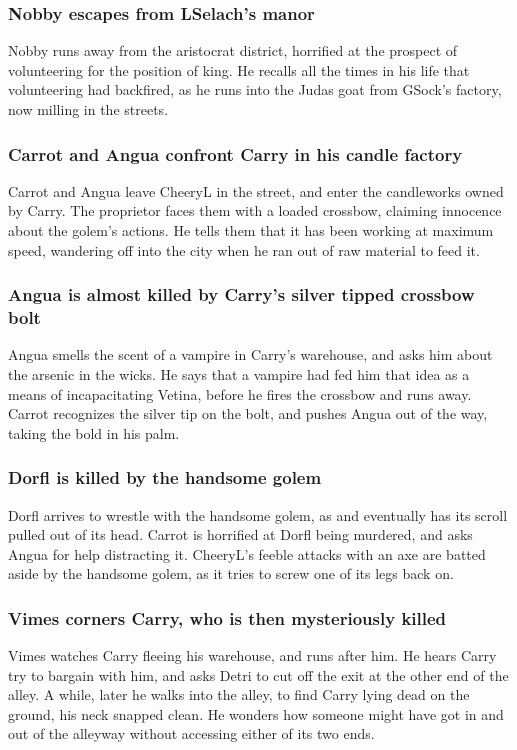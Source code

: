 \subsubsection{\Gls{Nobby} escapes from \Gls{LSelach}'s manor}
\Gls{Nobby} runs away from the aristocrat district, horrified at the prospect of volunteering for
the position of king. He recalls all the times in his life that volunteering had backfired, as he
runs into the Judas goat from \Gls{GSock}'s factory, now milling in the streets.

\subsubsection{\Gls{Carrot} and \Gls{Angua} confront \Gls{Carry} in his candle factory}
\Gls{Carrot} and \Gls{Angua} leave \Gls{CheeryL} in the street, and enter the candleworks owned
by \Gls{Carry}. The proprietor faces them with a loaded crossbow, claiming innocence about the
golem's actions. He tells them that it has been working at maximum speed, wandering off into the
city when he ran out of raw material to feed it.

\subsubsection{\Gls{Angua} is almost killed by \Gls{Carry}'s silver tipped crossbow bolt}
\Gls{Angua} smells the scent of a vampire in \Gls{Carry}'s warehouse, and asks him about the
arsenic in the wicks. He says that a vampire had fed him that idea as a means of incapacitating
\Gls{Vetina}, before he fires the crossbow and runs away. \Gls{Carrot} recognizes the silver tip
on the bolt, and pushes \Gls{Angua} out of the way, taking the bold in his palm.

\subsubsection{\Gls{Dorfl} is killed by the handsome golem}
\Gls{Dorfl} arrives to wrestle with the handsome golem, as and eventually has its scroll pulled
out of its head. \Gls{Carrot} is horrified at \Gls{Dorfl} being murdered, and asks \Gls{Angua} for
help distracting it. \Gls{CheeryL}'s feeble attacks with an axe are batted aside by the handsome
golem, as it tries to screw one of its legs back on.

\subsubsection{\Gls{Vimes} corners \Gls{Carry}, who is then mysteriously killed}
\Gls{Vimes} watches \Gls{Carry} fleeing his warehouse, and runs after him. He hears \Gls{Carry} try
to bargain with him, and asks \Gls{Detri} to cut off the exit at the other end of the alley. A
while, later he walks into the alley, to find \Gls{Carry} lying dead on the ground, his neck snapped
clean. He wonders how someone might have got in and out of the alleyway without accessing either of
its two ends.

